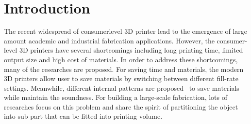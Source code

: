 \section{Introduction}
\label{sec:introduction}

The recent widespread of consumer\chinky{-}level 3D printer lead to the emergence of large amount academic and industrial fabrication applications.
However, the consumer-level 3D printers have several shortcomings including long printing time, limited output size and  high cost of materials. 
In order to address these shortcomings, many of the researches are proposed.
For saving time and materials, the modern 3D printers allow user to save materials by switching between different fill-rate settings.
Meanwhile, different internal patterns are proposed~\cite{Lu:2014:BSW} to save materials while maintain the  soundness.
For building a large-scale fabrication, lots of researches \cite{Medell:2007:ALRP, Hao:2011:APLM, Luo:2012:CPM, Hu:2014:APS, Vanek:2014:PMVO} focus on this problem and share the spirit of partitioning the object into sub-part that can be fitted into printing volume.


